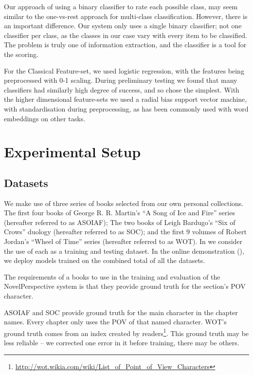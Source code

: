 \documentclass[11pt,a4paper]{article}
\begin{document}
Our approach of using a binary classifier to rate each possible class,
may seem similar to the one-vs-rest approach for multi-class classification.
However, there is an important difference.
Our system only uses a single binary classifier; not one classifier per class,
as the classes in our case vary with every item to be classified.
The problem is truly one of information extraction, and the classifier is a tool for the scoring.


For the Classical Feature-set, we used logistic regression, with the features being preprocessed with 0-1 scaling.
During preliminary testing we found that many classifiers had similarly high degree of success, and so chose the simplest.
With the higher dimensional feature-sets we used a radial bias support vector machine, with  standardisation during preprocessing,
as has been commonly used with word embeddings on other tasks.



\section{Experimental Setup}\label{sec:experimental-setup}
\subsection{Datasets}
We make use of three series of books selected from our own personal collections.
The first four books of George R. R. Martin's ``A Song of Ice and Fire'' series (hereafter referred to as ASOIAF);
The two books of  Leigh Bardugo's ``Six of Crows'' duology (hereafter referred to as SOC);
and the first 9 volumes of Robert Jordan's ``Wheel of Time'' series (hereafter referred to as WOT).
In  we consider the use of each as a training and testing dataset.
In the online demonstration (), we deploy models trained on the combined total of all the datasets.



The requirements of a books to use in the training and evaluation of the NovelPerspective system is that they provide ground truth for the section's POV  character.

ASOIAF and SOC provide ground truth for the main character in the chapter names.
Every chapter only uses the POV of that named character.
WOT's ground truth comes from an index created by readers\footnote{\url{http://wot.wikia.com/wiki/List_of_Point_of_View_Characters}}.
This ground truth may be less reliable -- we corrected one error in it before training, there may be others.
\end{document}
